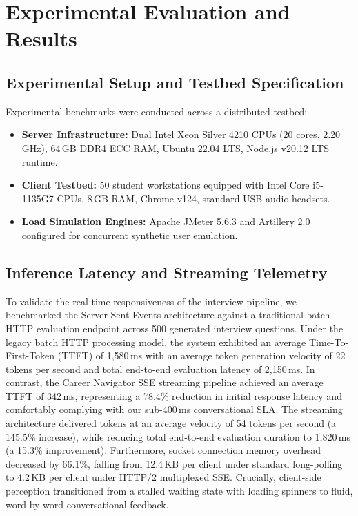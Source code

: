 \documentclass[conference]{IEEEtran}
\begin{document}
\section{Experimental Evaluation and Results}

\subsection{Experimental Setup and Testbed Specification}
Experimental benchmarks were conducted across a distributed testbed:
\begin{itemize}
    \item \textbf{Server Infrastructure:} Dual Intel Xeon Silver 4210 CPUs (20 cores, 2.20\,GHz), 64\,GB DDR4 ECC RAM, Ubuntu 22.04 LTS, Node.js v20.12 LTS runtime.
    \item \textbf{Client Testbed:} 50 student workstations equipped with Intel Core i5-1135G7 CPUs, 8\,GB RAM, Chrome v124, standard USB audio headsets.
    \item \textbf{Load Simulation Engines:} Apache JMeter 5.6.3 and Artillery 2.0 configured for concurrent synthetic user emulation.
\end{itemize}

\subsection{Inference Latency and Streaming Telemetry}
To validate the real-time responsiveness of the interview pipeline, we benchmarked the Server-Sent Events architecture against a traditional batch HTTP evaluation endpoint across 500 generated interview questions. Under the legacy batch HTTP processing model, the system exhibited an average Time-To-First-Token (TTFT) of 1,580\,ms with an average token generation velocity of 22 tokens per second and total end-to-end evaluation latency of 2,150\,ms. In contrast, the Career Navigator SSE streaming pipeline achieved an average TTFT of 342\,ms, representing a 78.4\% reduction in initial response latency and comfortably complying with our sub-400\,ms conversational SLA. The streaming architecture delivered tokens at an average velocity of 54 tokens per second (a 145.5\% increase), while reducing total end-to-end evaluation duration to 1,820\,ms (a 15.3\% improvement). Furthermore, socket connection memory overhead decreased by 66.1\%, falling from 12.4\,KB per client under standard long-polling to 4.2\,KB per client under HTTP/2 multiplexed SSE. Crucially, client-side perception transitioned from a stalled waiting state with loading spinners to fluid, word-by-word conversational feedback.
\end{document}
